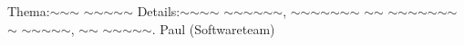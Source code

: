 
%
	{Thema:}{$\sim$$\sim$$\sim$ $\sim$$\sim$$\sim$$\sim$$\sim$}%
	{Details:}{$\sim$$\sim$$\sim$$\sim$ $\sim$$\sim$$\sim$$\sim$$\sim$$\sim$, $\sim$$\sim$$\sim$$\sim$$\sim$$\sim$$\sim$ $\sim$$\sim$ $\sim$$\sim$$\sim$$\sim$$\sim$$\sim$$\sim$$\sim$ $\sim$$\sim$$\sim$$\sim$$\sim$, $\sim$$\sim$ $\sim$$\sim$$\sim$$\sim$$\sim$.}
	{Paul (Softwareteam)}